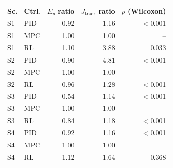 \begin{tabular}{llrrr}
\toprule
Sc. & Ctrl. & $E_u$ ratio & $J_\mathrm{track}$ ratio & $p$ (Wilcoxon) \\
\midrule
S1 & PID & 0.92 & 1.16 & $<$0.001 \\
S1 & MPC & 1.00 & 1.00 & -- \\
S1 & RL & 1.10 & 3.88 & 0.033 \\
S2 & PID & 0.90 & 4.81 & $<$0.001 \\
S2 & MPC & 1.00 & 1.00 & -- \\
S2 & RL & 0.96 & 1.28 & $<$0.001 \\
S3 & PID & 0.54 & 1.14 & $<$0.001 \\
S3 & MPC & 1.00 & 1.00 & -- \\
S3 & RL & 0.84 & 1.18 & $<$0.001 \\
S4 & PID & 0.92 & 1.16 & $<$0.001 \\
S4 & MPC & 1.00 & 1.00 & -- \\
S4 & RL & 1.12 & 1.64 & 0.368 \\
\bottomrule
\end{tabular}
